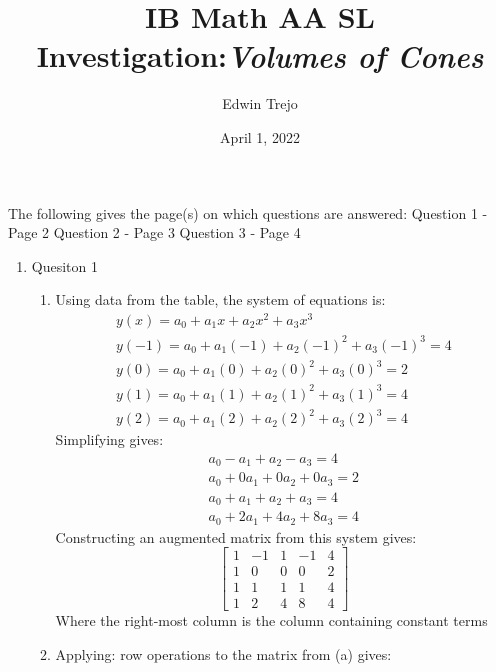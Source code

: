 \documentclass{article}
\title{IB Math AA SL Investigation:\emph{Volumes of Cones}}
\author{Edwin Trejo}
\date{April 1, 2022}
\begin{document}
\maketitle

The following gives the page(s) on which questions are answered: \newline
Question 1 - Page 2 \newline
Question 2 - Page 3 \newline
Question 3 - Page 4

\newpage

\begin{enumerate}

    \item Quesiton 1
    \begin{enumerate}
        \item Using data from the table, the system of equations is:
        \begin{align*}
            y(x) = a_0 + a_1x + a_2x^2 + a_3x^3 \\
            y(-1) = a_0 + a_1(-1) + a_2(-1)^2 + a_3(-1)^3 = 4 \\
            y(0) = a_0 + a_1(0) + a_2(0)^2 + a_3(0)^3 = 2 \\
            y(1) = a_0 + a_1(1) + a_2(1)^2 + a_3(1)^3 = 4 \\
            y(2) = a_0 + a_1(2) + a_2(2)^2 + a_3(2)^3 = 4
        \end{align*}
        Simplifying gives:
        \begin{align*}
            a_0 - a_1 + a_2 - a_3 = 4 \\
            a_0 + 0a_1 + 0a_2 + 0a_3 = 2 \\
            a_0 + a_1 + a_2 + a_3 = 4 \\
            a_0 + 2a_1 + 4a_2 + 8a_3 = 4
        \end{align*}
        Constructing an augmented matrix from this system gives:
        $$\begin{bmatrix}
            1 & -1 & 1 & -1 & 4 \\
            1 & 0 & 0 & 0 & 2 \\
            1 & 1 & 1 & 1 & 4 \\
            1 & 2 & 4 & 8 & 4 
        \end{bmatrix}$$
        Where the right-most column is the column containing constant terms \newline
        \item Applying: row operations to the matrix from (a) gives:

\end{enumerate}
\end{enumerate}
\end{document}
